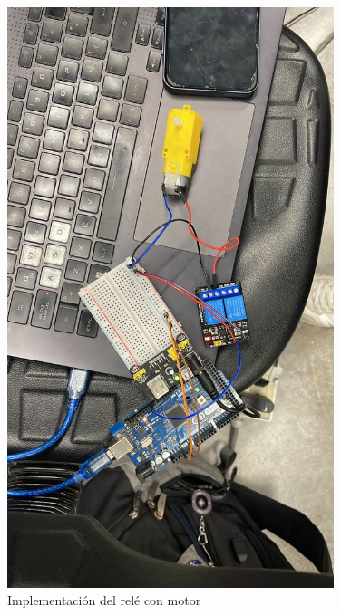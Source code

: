 \begin{figure}[H]
    \centering
    \includegraphics[width=0.85\textwidth]{./img/checkpoint_presencialrele.jpeg}
    \caption{Implementación del relé con motor}
    \label{fig:motor_driver}
\end{figure}

